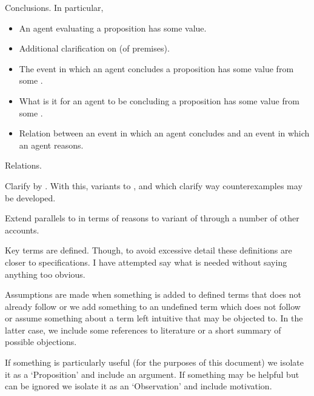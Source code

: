 \begin{note}
  \begin{TOCEnum}
  \item

    Conclusions.
    In particular,

    \begin{itemize}
    \item
      An agent evaluating a proposition has some value.
    \item
      Additional clarification on \pool{} (of premises).
    \item
      The event in which an agent concludes a proposition has some value from some \pool{}.
    \item
      What is it for an agent to be concluding a proposition has some value from some \pool{}.
    \item
      Relation between an event in which an agent concludes and an event in which an agent reasons.
    \end{itemize}
  \item

    Relations.

    Clarify by .
    With this, variants to \qWhy{}, \qHow{} and \issueInclusion{} which clarify way counterexamples may be developed.
  \item

    Extend parallels to \issueInclusion{} in terms of reasons to variant of \issueInclusion{} through a number of other accounts.
  \end{TOCEnum}
\end{note}

\begin{note}
  Key terms are defined.
  Though, to avoid excessive detail these definitions are closer to specifications.
  I have attempted say what is needed without saying anything too obvious.

  Assumptions are made when something is added to defined terms that does not already follow or we add something to an undefined term which does not follow or assume something about a term left intuitive that may be objected to.
  In the latter case, we include some references to literature or a short summary of possible objections.

  If something is particularly useful (for the purposes of this document) we isolate it as a `Proposition' and include an argument.
  If something may be helpful but can be ignored we isolate it as an `Observation' and include motivation.
\end{note}

